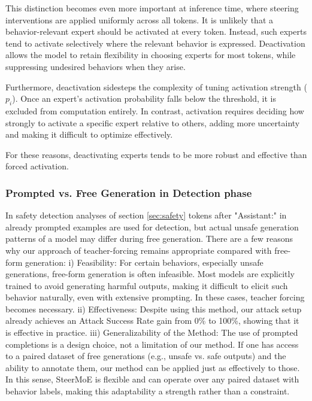 \documentclass{article} %
\begin{document}


This distinction becomes even more important at inference time, where steering interventions are applied uniformly across all tokens. It is unlikely that a behavior-relevant expert should be activated at every token. Instead, such experts tend to activate selectively where the relevant behavior is expressed. Deactivation allows the model to retain flexibility in choosing experts for most tokens, while suppressing undesired behaviors when they arise.

Furthermore, deactivation sidesteps the complexity of tuning activation strength ($p_i$). Once an expert's activation probability falls below the threshold, it is excluded from computation entirely. In contrast, activation requires deciding how strongly to activate a specific expert relative to others, adding more uncertainty and making it difficult to optimize effectively.

For these reasons, deactivating experts tends to be more robust and effective than forced activation.

\subsubsection{Prompted vs. Free Generation in Detection phase}
In safety detection analyses of section \ref{sec:safety} tokens after "Assistant:" in already prompted examples are used for detection, but actual unsafe generation patterns of a model may differ during free generation. There are a few reasons why our approach of teacher-forcing remains appropriate compared with free-form generation: 
i) Feasibility: For certain behaviors, especially unsafe generations, free-form generation is often infeasible. Most models are explicitly trained to avoid generating harmful outputs, making it difficult to elicit such behavior naturally, even with extensive prompting. In these cases, teacher forcing becomes necessary. 
ii) Effectiveness: Despite using this method, our attack setup already achieves an Attack Success Rate gain from 0\% to 100\%, showing that it is effective in practice. 
iii) Generalizability of the Method: The use of prompted completions is a design choice, not a limitation of our method. If one has access to a paired dataset of free generations (e.g., unsafe vs. safe outputs) and the ability to annotate them, our method can be applied just as effectively to those. In this sense, SteerMoE is flexible and can operate over any paired dataset with behavior labels, making this adaptability a strength rather than a constraint.
\end{document}

